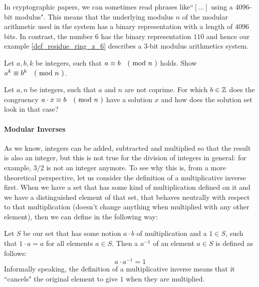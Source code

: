 \begin{jargon} In cryptographic papers, we can sometimes read phrases like``$[\ldots]$ using a 4096-bit modulus". This means that the underlying modulus $n$ of the modular arithmetic used in the system has a binary representation with a length of $4096$ bits. In contrast, the number $6$ has the binary representation $110$ and hence our example \ref{def_residue_ring_z_6}
 describes a $3$-bit modulus arithmetics system.   
\end{jargon}
\begin{exercise}
Let $a,b,k$ be integers, such that $a \equiv b \quad \text{( mod } n \text{ )}$ holds. Show $a^k \equiv b^k \quad \text{( mod } n \text{ )}$.
\end{exercise}
\begin{exercise}
Let $a,n$ be integers, such that $a$ and $n$ are not coprime. For which $b\in\mathbb{Z}$ does the 
congruency $a\cdot x \equiv b \quad \text{( mod } n \text{ )}$ have a solution $x$ and how does the solution set look in that case?
\end{exercise}
\paragraph{Modular Inverses} 
As we know, integers can be added, subtracted and multiplied so that the result is also an integer, but this is not true for the division of integers in general: for example, $3/2$ is not an integer anymore. To see why this is, from a more theoretical perspective, let us consider the definition of a multiplicative inverse first. When we have a set that has some kind of multiplication defined on it and we have a distinguished element of that set, that behaves neutrally with respect to that multiplication (doesn't change anything when multiplied with any other element), then we can define  in the following way:

Let $S$ be our set that has some notion $a\cdot b$ of multiplication and a  $1\in S$, such that $1\cdot a = a$ for all elements $a\in S$. Then a  $a^{-1}$ of an element $a\in S$ is defined as follows:
\begin{equation}
a\cdot a^{-1} = 1
\end{equation}
Informally speaking, the definition of a multiplicative inverse means that it ``cancels" the original element to give $1$ when they are multiplied. 

